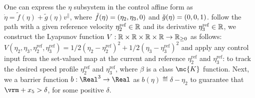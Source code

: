 {One can express the $\eta$ subsystem in the control affine form as $\dot \eta = \tilde{f}(\eta) + \tilde{g}(\eta)v^\parallel$, where $\tilde{f}{(\eta)} = (\eta_2,\eta_3,0)$ and $\tilde{g}{(\eta)} = (0,0,1)$.  follow the path with a given reference velocity ${\eta}^{\mathrm{ref}}_{2}\in\mathbb{R}$ and its derivative $\eta^{\mathrm{ref}}_{3}\in\mathbb{R}$, we construct the Lyapunov function $V: \mathbb{R}\times\mathbb{R}\times \mathbb{R}\times\mathbb{R}\to \mathbb{R}_{\geq 0}$ as follows:
$
V(\eta_{2}, \eta_{3}, {\eta}^{\mathrm{ref}}_{2}, \eta^{\mathrm{ref}}_{3}) = 1/2(\eta_2 - {\eta}^{\mathrm{ref}}_{2})^2 + 1/2(\eta_3 - { \eta}^{\mathrm{ref}}_{3})^2
$ and apply any control input from the set-valued map  at the current  and reference ${\eta}^{\mathrm{ref}}_{2}$ and $\eta^{\mathrm{ref}}_{3}$:
to track the desired speed profile ${\eta}^{\mathrm{ref}}_{2}$ and $\eta^{\mathrm{ref}}_{3}$, where $\beta$ is a class $\mc{K}$ function. Next, we  a barrier function 
$
b: \Real^3 \to \Real
$ as 
$
b(\eta) \eqdef \delta - \eta_2
$ to guarantee that $\vrm + x_5 > \delta$, for some positive $\delta$.
}
